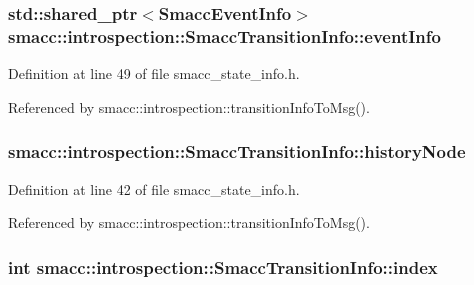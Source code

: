 \subsubsection[{\texorpdfstring{event\+Info}{eventInfo}}]{\setlength{\rightskip}{0pt plus 5cm}std\+::shared\+\_\+ptr$<${\bf Smacc\+Event\+Info}$>$ smacc\+::introspection\+::\+Smacc\+Transition\+Info\+::event\+Info}\hypertarget{structsmacc_1_1introspection_1_1SmaccTransitionInfo_a573be95bb6fdeeae46fc5ed56b260138}{}\label{structsmacc_1_1introspection_1_1SmaccTransitionInfo_a573be95bb6fdeeae46fc5ed56b260138}


Definition at line 49 of file smacc\+\_\+state\+\_\+info.\+h.



Referenced by smacc\+::introspection\+::transition\+Info\+To\+Msg().

\subsubsection[{\texorpdfstring{history\+Node}{historyNode}}]{ smacc\+::introspection\+::\+Smacc\+Transition\+Info\+::history\+Node}\hypertarget{structsmacc_1_1introspection_1_1SmaccTransitionInfo_acbb8f7891dd0c541b26feb82149cb780}{}\label{structsmacc_1_1introspection_1_1SmaccTransitionInfo_acbb8f7891dd0c541b26feb82149cb780}


Definition at line 42 of file smacc\+\_\+state\+\_\+info.\+h.



Referenced by smacc\+::introspection\+::transition\+Info\+To\+Msg().

\subsubsection[{\texorpdfstring{index}{index}}]{\setlength{\rightskip}{0pt plus 5cm}int smacc\+::introspection\+::\+Smacc\+Transition\+Info\+::index}\hypertarget{structsmacc_1_1introspection_1_1SmaccTransitionInfo_a4b9e9f140aefd8ecd6697bcaa4b681af}{}\label{structsmacc_1_1introspection_1_1SmaccTransitionInfo_a4b9e9f140aefd8ecd6697bcaa4b681af}


